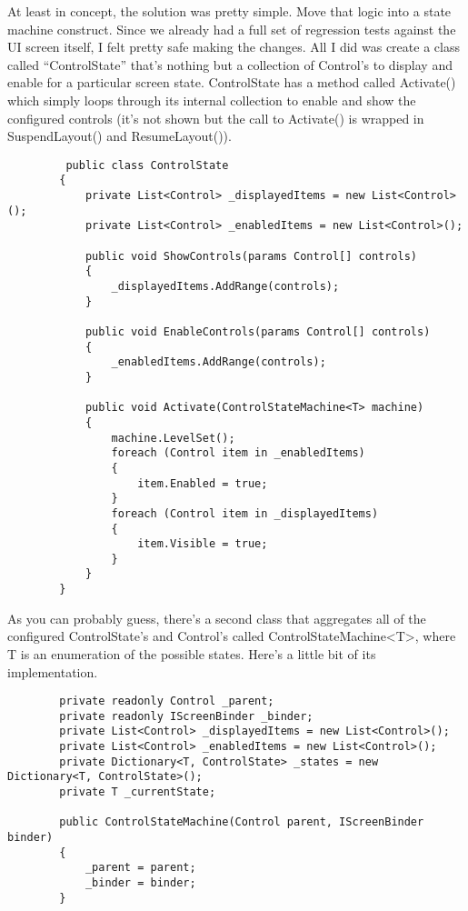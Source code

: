 \documentclass{article}
\begin{document}
{At least in concept, the solution was pretty simple.  Move that logic into a state machine construct.  Since we already had a full set of regression tests against the UI screen itself, I felt pretty safe making the changes.  All I did was create a class called “ControlState” that's nothing but a collection of Control's to display and enable for a particular screen state.  ControlState has a method called Activate() which simply loops through its internal collection to enable and show the configured controls (it's not shown but the call to Activate() is wrapped in SuspendLayout() and ResumeLayout()). 
\newpage
\begin{lstlisting}
         public class ControlState
        {
            private List<Control> _displayedItems = new List<Control>();
            private List<Control> _enabledItems = new List<Control>();

            public void ShowControls(params Control[] controls)
            {
                _displayedItems.AddRange(controls);
            } 

            public void EnableControls(params Control[] controls)
            {
                _enabledItems.AddRange(controls);
            } 

            public void Activate(ControlStateMachine<T> machine)
            {
                machine.LevelSet(); 
                foreach (Control item in _enabledItems)
                {
                    item.Enabled = true;
                } 
                foreach (Control item in _displayedItems)
                {
                    item.Visible = true;
                }
            }
        }
\end{lstlisting}

As you can probably guess, there's a second class that aggregates all of the configured ControlState's and Control's called ControlStateMachine<T>, where T is an enumeration of the possible states.  Here's a little bit of its implementation. 
 
\begin{lstlisting}
        private readonly Control _parent;
        private readonly IScreenBinder _binder;
        private List<Control> _displayedItems = new List<Control>();
        private List<Control> _enabledItems = new List<Control>();
        private Dictionary<T, ControlState> _states = new Dictionary<T, ControlState>();
        private T _currentState; 

        public ControlStateMachine(Control parent, IScreenBinder binder)
        {
            _parent = parent;
            _binder = binder;
        } 


\end{lstlisting}}
\end{document}
